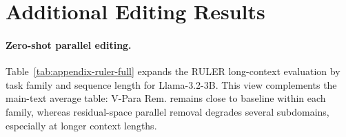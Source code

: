 \clearpage
\section{Additional Editing Results}
\label{app:additional-editing}

\paragraph{Zero-shot parallel editing.}
Table~\ref{tab:appendix-ruler-full} expands the RULER long-context evaluation
by task family and sequence length for Llama-3.2-3B. This view complements the
main-text average table: V-Para Rem. remains close to baseline within each
family, whereas residual-space parallel removal degrades several subdomains,
especially at longer context lengths.

